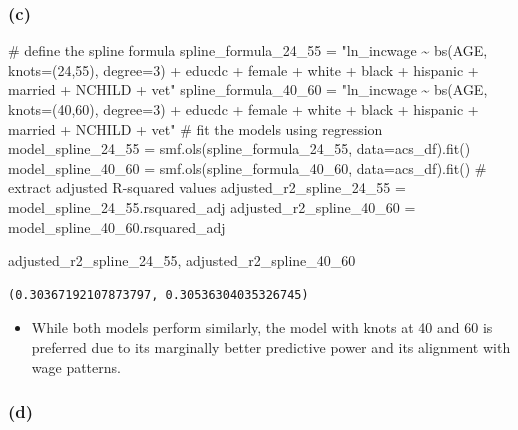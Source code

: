 \documentclass[
  letterpaper,
  DIV=11,
  numbers=noendperiod]{scrartcl}
\newenvironment{Shaded}{\begin{snugshade}}{\end{snugshade}}
\newcommand{\CommentTok}[1]{\textcolor[rgb]{0.37,0.37,0.37}{#1}}
\newcommand{\NormalTok}[1]{\textcolor[rgb]{0.00,0.23,0.31}{#1}}
\newcommand{\OperatorTok}[1]{\textcolor[rgb]{0.37,0.37,0.37}{#1}}
\newcommand{\StringTok}[1]{\textcolor[rgb]{0.13,0.47,0.30}{#1}}
\providecommand{\tightlist}{%
  \setlength{\itemsep}{0pt}\setlength{\parskip}{0pt}}\usepackage{longtable,booktabs,array}
\begin{document}
\subsubsection{(c)}\label{c-3}

\begin{Shaded}
\begin{Highlighting}[]
\CommentTok{\# define the spline formula}
\NormalTok{spline\_formula\_24\_55 }\OperatorTok{=} \StringTok{"ln\_incwage \textasciitilde{} bs(AGE, knots=(24,55), degree=3) + educdc + female + white + black + hispanic + married + NCHILD + vet"}
\NormalTok{spline\_formula\_40\_60 }\OperatorTok{=} \StringTok{"ln\_incwage \textasciitilde{} bs(AGE, knots=(40,60), degree=3) + educdc + female + white + black + hispanic + married + NCHILD + vet"}
\CommentTok{\# fit the models using regression}
\NormalTok{model\_spline\_24\_55 }\OperatorTok{=}\NormalTok{ smf.ols(spline\_formula\_24\_55, data}\OperatorTok{=}\NormalTok{acs\_df).fit()}
\NormalTok{model\_spline\_40\_60 }\OperatorTok{=}\NormalTok{ smf.ols(spline\_formula\_40\_60, data}\OperatorTok{=}\NormalTok{acs\_df).fit()}
\CommentTok{\# extract adjusted R{-}squared values}
\NormalTok{adjusted\_r2\_spline\_24\_55 }\OperatorTok{=}\NormalTok{ model\_spline\_24\_55.rsquared\_adj}
\NormalTok{adjusted\_r2\_spline\_40\_60 }\OperatorTok{=}\NormalTok{ model\_spline\_40\_60.rsquared\_adj}

\NormalTok{adjusted\_r2\_spline\_24\_55, adjusted\_r2\_spline\_40\_60}
\end{Highlighting}
\end{Shaded}

\begin{verbatim}
(0.30367192107873797, 0.30536304035326745)
\end{verbatim}

\begin{itemize}
\tightlist
\item
  While both models perform similarly, the model with knots at 40 and 60
  is preferred due to its marginally better predictive power and its
  alignment with wage patterns.
\end{itemize}

\subsubsection{(d)}\label{d-3}
\end{document}

